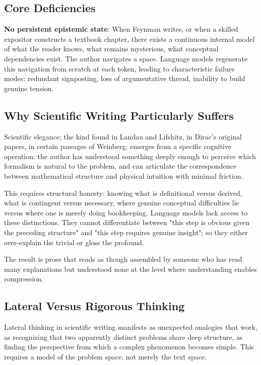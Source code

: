 \subsection*{Core Deficiencies}

\textbf{No persistent epistemic state}: When Feynman writes, or when a skilled expositor constructs a textbook chapter, there exists a continuous internal model of what the reader knows, what remains mysterious, what conceptual dependencies exist. The author navigates a space. Language models regenerate this navigation from scratch at each token, leading to characteristic failure modes: redundant signposting, loss of argumentative thread, inability to build genuine tension.

\subsection*{Why Scientific Writing Particularly Suffers}

Scientific elegance; the kind found in Landau and Lifshitz, in Dirac's original papers, in certain passages of Weinberg; emerges from a specific cognitive operation: the author has understood something deeply enough to perceive which formalism is natural to the problem, and can articulate the correspondence between mathematical structure and physical intuition with minimal friction.

This requires structural honesty: knowing what is definitional versus derived, what is contingent versus necessary, where genuine conceptual difficulties lie versus where one is merely doing bookkeeping. Language models lack access to these distinctions. They cannot differentiate between "this step is obvious given the preceding structure" and "this step requires genuine insight"; so they either over-explain the trivial or gloss the profound.

The result is prose that reads as though assembled by someone who has read many explanations but understood none at the level where understanding enables compression.

\subsection*{Lateral Versus Rigorous Thinking}

Lateral thinking in scientific writing manifests as unexpected analogies that work, as recognizing that two apparently distinct problems share deep structure, as finding the perspective from which a complex phenomenon becomes simple. This requires a model of the problem space, not merely the text space.

